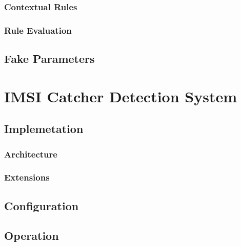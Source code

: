 \subsubsection{Contextual Rules}

\subsubsection{Rule Evaluation}

\subsection{Fake Parameters}
\label{sec:fake_parameters}


\section{IMSI Catcher Detection System}
\label{sec:icds}
\subsection{Implemetation}
\subsubsection{Architecture}
\subsubsection{Extensions}
\subsection{Configuration}
\subsection{Operation}
\label{sec:icds_operation}
